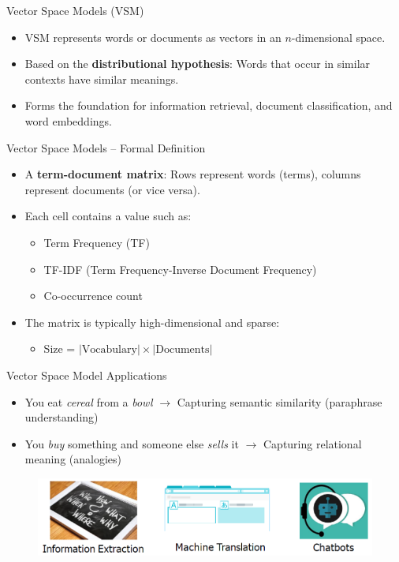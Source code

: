\begin{frame}{Vector Space Models (VSM)}
    \begin{itemize}
        \item VSM represents words or documents as vectors in an $n$-dimensional space.
        \item Based on the \textbf{distributional hypothesis}: Words that occur in similar contexts have similar meanings.
        \item Forms the foundation for information retrieval, document classification, and word embeddings.
    \end{itemize}
\end{frame}

\begin{frame}{Vector Space Models – Formal Definition}
    \begin{itemize}
        \item A \textbf{term-document matrix}: Rows represent words (terms), columns represent documents (or vice versa).
        \item Each cell contains a value such as:
        \begin{itemize}
            \item Term Frequency (TF)
            \item TF-IDF (Term Frequency-Inverse Document Frequency)
            \item Co-occurrence count
        \end{itemize}
        \item The matrix is typically high-dimensional and sparse:
        \begin{itemize}
            \item Size = $|\text{Vocabulary}| \times |\text{Documents}|$
        \end{itemize}
    \end{itemize}
\end{frame}

\begin{frame}{Vector Space Model Applications}
    \begin{itemize}
        \item You eat \textit{cereal} from a \textit{bowl} $\rightarrow$ Capturing semantic similarity (paraphrase understanding)
        \item You \textit{buy} something and someone else \textit{sells} it $\rightarrow$ Capturing relational meaning (analogies)
    \end{itemize}
    \begin{figure}    \centering
        \includegraphics[width=\textwidth,height=0.8\textheight,keepaspectratio]{images/vector-space/vector-space-application.png}
    \end{figure}
\end{frame}

